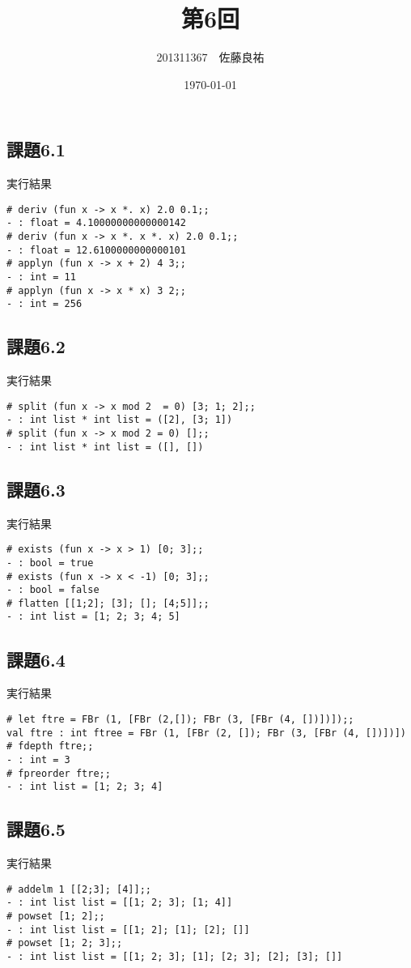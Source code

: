 \documentclass[11pt,a4j]{jarticle}
\title{第6回}
\author{201311367　佐藤良祐}
\date{\today}
\begin{document}
\subsection*{課題6.1}

実行結果
\begin{lstlisting}
# deriv (fun x -> x *. x) 2.0 0.1;;
- : float = 4.10000000000000142
# deriv (fun x -> x *. x *. x) 2.0 0.1;;
- : float = 12.6100000000000101
# applyn (fun x -> x + 2) 4 3;;
- : int = 11
# applyn (fun x -> x * x) 3 2;;
- : int = 256
\end{lstlisting}
\subsection*{課題6.2}

実行結果
\begin{lstlisting}
# split (fun x -> x mod 2  = 0) [3; 1; 2];;
- : int list * int list = ([2], [3; 1])
# split (fun x -> x mod 2 = 0) [];;
- : int list * int list = ([], [])
\end{lstlisting}
\newpage
\subsection*{課題6.3}

実行結果
\begin{lstlisting}
# exists (fun x -> x > 1) [0; 3];;
- : bool = true
# exists (fun x -> x < -1) [0; 3];;
- : bool = false
# flatten [[1;2]; [3]; []; [4;5]];;
- : int list = [1; 2; 3; 4; 5]
\end{lstlisting}
\subsection*{課題6.4}

実行結果
\begin{lstlisting}
# let ftre = FBr (1, [FBr (2,[]); FBr (3, [FBr (4, [])])]);;
val ftre : int ftree = FBr (1, [FBr (2, []); FBr (3, [FBr (4, [])])])
# fdepth ftre;;
- : int = 3
# fpreorder ftre;;
- : int list = [1; 2; 3; 4]
\end{lstlisting}
\newpage
\subsection*{課題6.5}

実行結果
\begin{lstlisting}
# addelm 1 [[2;3]; [4]];;
- : int list list = [[1; 2; 3]; [1; 4]]
# powset [1; 2];;
- : int list list = [[1; 2]; [1]; [2]; []]
# powset [1; 2; 3];;
- : int list list = [[1; 2; 3]; [1]; [2; 3]; [2]; [3]; []]
\end{lstlisting}
\end{document}

